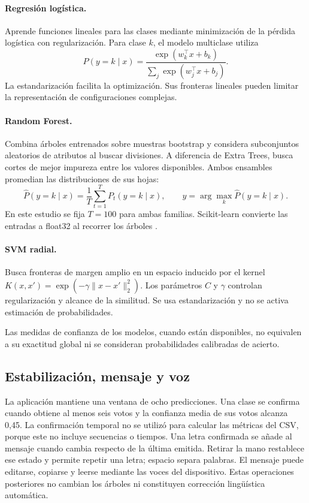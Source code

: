 \documentclass[11pt,a4paper]{article}
\begin{document}
\paragraph{Regresión logística.} Aprende funciones lineales para las clases mediante minimización de la pérdida logística con regularización. Para clase $k$, el modelo multiclase utiliza
\begin{equation}
P(y=k\mid x)=\frac{\exp(w_k^\top x+b_k)}{\sum_j\exp(w_j^\top x+b_j)}.
\end{equation}
La estandarización facilita la optimización. Sus fronteras lineales pueden limitar la representación de configuraciones complejas.

\paragraph{Random Forest.} Combina árboles entrenados sobre muestras bootstrap y considera subconjuntos aleatorios de atributos al buscar divisiones. A diferencia de Extra Trees, busca cortes de mejor impureza entre los valores disponibles. Ambos ensambles promedian las distribuciones de sus hojas:
\begin{equation}
\widehat P(y=k\mid x)=\frac1T\sum_{t=1}^{T}P_t(y=k\mid x),\qquad
\widehat y=\arg\max_k\widehat P(y=k\mid x).
\end{equation}
En este estudio se fija $T=100$ para ambas familias. Scikit-learn convierte las entradas a float32 al recorrer los árboles \cite{sklearn}.

\paragraph{SVM radial.} Busca fronteras de margen amplio en un espacio inducido por el kernel $K(x,x')=\exp(-\gamma\|x-x'\|_2^2)$. Los parámetros $C$ y $\gamma$ controlan regularización y alcance de la similitud. Se usa estandarización y no se activa estimación de probabilidades.

Las medidas de confianza de los modelos, cuando están disponibles, no equivalen a su exactitud global ni se consideran probabilidades calibradas de acierto.

\subsection{Estabilización, mensaje y voz}
La aplicación mantiene una ventana de ocho predicciones. Una clase se confirma cuando obtiene al menos seis votos y la confianza media de sus votos alcanza 0,45. La confirmación temporal no se utilizó para calcular las métricas del CSV, porque este no incluye secuencias o tiempos. Una letra confirmada se añade al mensaje cuando cambia respecto de la última emitida. Retirar la mano restablece ese estado y permite repetir una letra; espacio separa palabras. El mensaje puede editarse, copiarse y leerse mediante las voces del dispositivo. Estas operaciones posteriores no cambian los árboles ni constituyen corrección lingüística automática.
\end{document}
